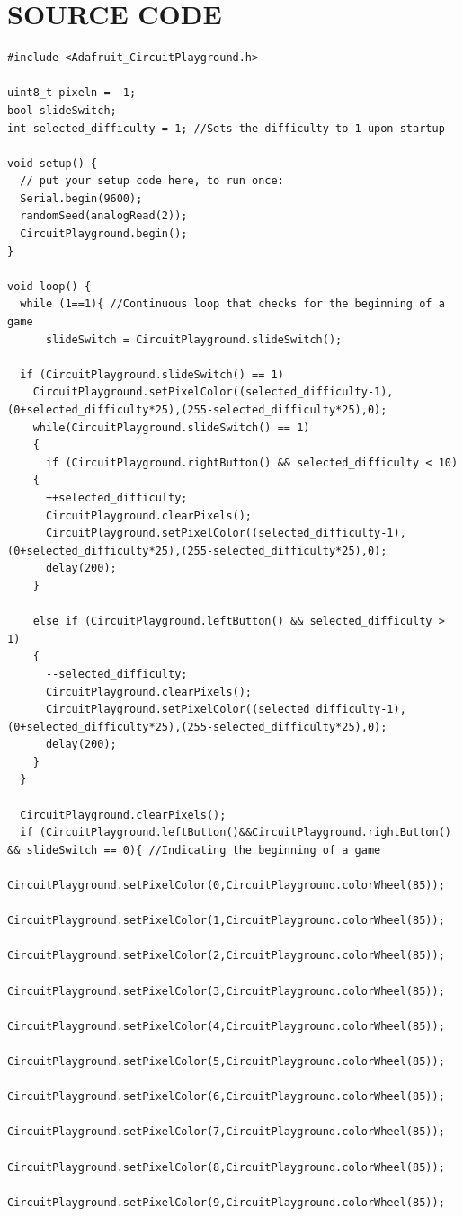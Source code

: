 \documentclass[12pt]{article}
\begin{document}
\section{SOURCE CODE}
%
\tiny
\begin{lstlisting}[language=Arduino]
#include <Adafruit_CircuitPlayground.h>

uint8_t pixeln = -1;
bool slideSwitch;
int selected_difficulty = 1; //Sets the difficulty to 1 upon startup

void setup() {
  // put your setup code here, to run once:
  Serial.begin(9600);
  randomSeed(analogRead(2));
  CircuitPlayground.begin();
}

void loop() {
  while (1==1){ //Continuous loop that checks for the beginning of a game
      slideSwitch = CircuitPlayground.slideSwitch();

  if (CircuitPlayground.slideSwitch() == 1)
    CircuitPlayground.setPixelColor((selected_difficulty-1),(0+selected_difficulty*25),(255-selected_difficulty*25),0);
    while(CircuitPlayground.slideSwitch() == 1) 
    {
      if (CircuitPlayground.rightButton() && selected_difficulty < 10)
    {
      ++selected_difficulty;
      CircuitPlayground.clearPixels();
      CircuitPlayground.setPixelColor((selected_difficulty-1),(0+selected_difficulty*25),(255-selected_difficulty*25),0);
      delay(200);
    }

    else if (CircuitPlayground.leftButton() && selected_difficulty > 1)
    {
      --selected_difficulty;
      CircuitPlayground.clearPixels();
      CircuitPlayground.setPixelColor((selected_difficulty-1),(0+selected_difficulty*25),(255-selected_difficulty*25),0);
      delay(200);
    }
  }
    
  CircuitPlayground.clearPixels();
  if (CircuitPlayground.leftButton()&&CircuitPlayground.rightButton() && slideSwitch == 0){ //Indicating the beginning of a game
    CircuitPlayground.setPixelColor(0,CircuitPlayground.colorWheel(85));
    CircuitPlayground.setPixelColor(1,CircuitPlayground.colorWheel(85));
    CircuitPlayground.setPixelColor(2,CircuitPlayground.colorWheel(85));
    CircuitPlayground.setPixelColor(3,CircuitPlayground.colorWheel(85));
    CircuitPlayground.setPixelColor(4,CircuitPlayground.colorWheel(85));
    CircuitPlayground.setPixelColor(5,CircuitPlayground.colorWheel(85));
    CircuitPlayground.setPixelColor(6,CircuitPlayground.colorWheel(85));
    CircuitPlayground.setPixelColor(7,CircuitPlayground.colorWheel(85));
    CircuitPlayground.setPixelColor(8,CircuitPlayground.colorWheel(85));
    CircuitPlayground.setPixelColor(9,CircuitPlayground.colorWheel(85));


\end{lstlisting}
\end{document}
